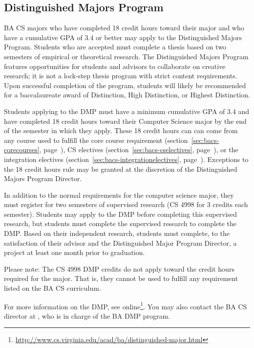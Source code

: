 \documentclass[10pt,letter,twocolumn]{book}
\newcommand{\myurl}[1]{\footnote{\scriptsize\url{#1}}}
\begin{document}
\subsection{Distinguished Majors Program}
\label{sec:badmp}

BA CS majors who have completed 18 credit hours toward their major
and who have a cumulative GPA of 3.4 or better may apply to the
Distinguished Majors Program. Students who are accepted must complete
a thesis based on two semesters of empirical or theoretical
research. The Distinguished Majors Program features opportunities for
students and advisors to collaborate on creative research; it is not a
lock-step thesis program with strict content requirements. Upon
successful completion of the program, students will likely be
recommended for a baccalaureate award of Distinction, High
Distinction, or Highest Distinction.

Students applying to the DMP must have a minimum cumulative GPA of 3.4
and have completed 18 credit hours toward their Computer Science major
by the end of the semester in which they apply. These 18 credit hours
can can come from any course used to fulfill the core course
requirement (section~\ref{sec:bacs-corecourses},
page~\pageref{sec:bacs-corecourses}), CS electives
(section~\ref{sec:bacs-cselectives},
page~\pageref{sec:bacs-cselectives}), or the integration electives
(section~\ref{sec:bacs-integrationelectives},
page~\pageref{sec:bacs-integrationelectives}).
Exceptions to the 18 credit hours rule may be granted at the
discretion of the Distinguished Majors Program Director.

In addition to the normal requirements for the computer science major,
they must register for two semesters of supervised research (CS 4998
for 3 credits each semester). Students may apply to the DMP before
completing this supervised research, but students must complete the
supervised research to complete the DMP. Based on their independent
research, students must complete, to the satisfaction of their advisor
and the Distinguished Major Program Director, a project at least one
month prior to graduation.

Please note: The CS 4998 DMP credits do not apply toward the credit
hours required for the major. That is, they cannot be used to fulfill
any requirement listed on the BA CS curriculum.

For more information on the DMP, see
online\myurl{http://www.cs.virginia.edu/acad/ba/distinguished-major.html}.
You may also contact the BA CS director at \bacsdirectoremail, who is
in charge of the BA DMP program.
\end{document}
